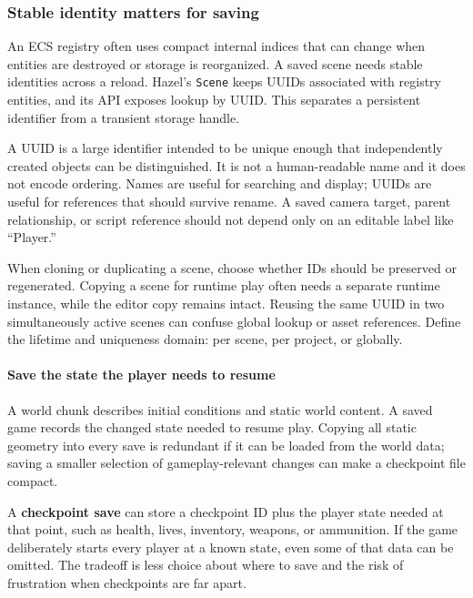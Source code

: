 \subsubsection{Stable identity matters for saving}\label{06-engine-ii-ch031-stable-identity-matters-for-saving}

An ECS registry often uses compact internal indices that can change when entities are destroyed or storage is reorganized. A saved scene needs stable identities across a reload. Hazel's \texttt{Scene} keeps UUIDs associated with registry entities, and its API exposes lookup by UUID. This separates a persistent identifier from a transient storage handle.

A UUID is a large identifier intended to be unique enough that independently created objects can be distinguished. It is not a human-readable name and it does not encode ordering. Names are useful for searching and display; UUIDs are useful for references that should survive rename. A saved camera target, parent relationship, or script reference should not depend only on an editable label like ``Player.''

When cloning or duplicating a scene, choose whether IDs should be preserved or regenerated. Copying a scene for runtime play often needs a separate runtime instance, while the editor copy remains intact. Reusing the same UUID in two simultaneously active scenes can confuse global lookup or asset references. Define the lifetime and uniqueness domain: per scene, per project, or globally.

\paragraph{Save the state the player needs to resume}\label{06-engine-ii-ch031-save-the-state-the-player-needs-to-resume}

A world chunk describes initial conditions and static world content. A saved game records the changed state needed to resume play. Copying all static geometry into every save is redundant if it can be loaded from the world data; saving a smaller selection of gameplay-relevant changes can make a checkpoint file compact.

A \textbf{checkpoint save} can store a checkpoint ID plus the player state needed at that point, such as health, lives, inventory, weapons, or ammunition. If the game deliberately starts every player at a known state, even some of that data can be omitted. The tradeoff is less choice about where to save and the risk of frustration when checkpoints are far apart.

